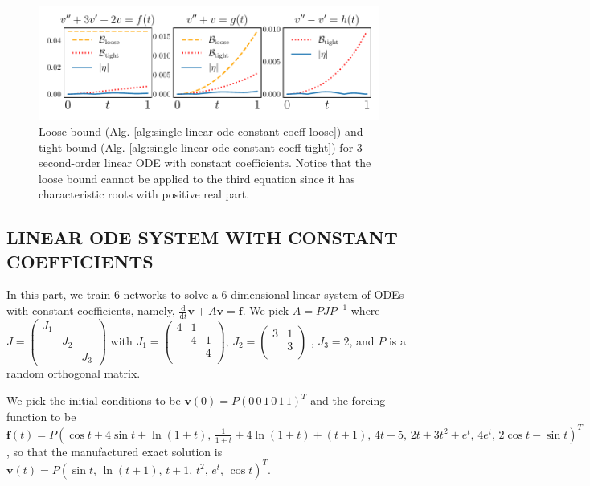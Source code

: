 \documentclass[accepted]{uai2023}
\newcommand{\vect}[1]{\mathbf{#1}}
\begin{document}
    \begin{figure}[!htp]
        \centering
        \vspace{-1em}
        \includegraphics[width=\linewidth]{assets/2nd-order.pdf}
        \caption{\small
            Loose bound (Alg. \ref{alg:single-linear-ode-constant-coeff-loose}) and tight bound (Alg. \ref{alg:single-linear-ode-constant-coeff-tight}) for 3 second-order linear ODE with constant coefficients.
            Notice that the loose bound cannot be applied to the third equation since it has characteristic roots with positive real part.
        }\label{fig:2nd-order-bound} 
    \end{figure}

\subsection{LINEAR ODE SYSTEM WITH CONSTANT COEFFICIENTS} \label{section:high-dimension}
    \begingroup 
        \setlength\arraycolsep{1pt}
        In this part, we train $6$ networks to solve a $6$-dimensional linear system of ODEs with constant coefficients, namely, $\frac{\mathrm{d}}{\mathrm{d}t}\vect{v} + A\vect{v} = \vect{f}$. 
        We pick $A = PJP^{-1}$ where {\small $J=\begin{pmatrix}J_1\\[-0.75ex]&J_2\\[-0.75ex]&&J_3\end{pmatrix}$} with {\small $J_1 = \begin{pmatrix} 4&1\\[-0.75ex]&4&1\\[-0.75ex]&&4\\[-0.5ex]\end{pmatrix}$, $J_2 = \begin{pmatrix} 3&1\\[-0.75ex]&3\\[-0.5ex]\end{pmatrix}$ }, $J_3=2$, and $P$ is a random orthogonal matrix.
    \endgroup

    We pick the initial conditions to be $\vect{v}(0) = P(0\, 0\, 1\, 0\, 1\, 1)^{T}$ and the forcing function to be $\vect{f}(t) = P(\cos t + 4 \sin t  + \ln(1+t),\, \frac{1}{1+t} + 4 \ln(1+t) + (t+1),\, 4t + 5,\, 2t + 3t^2 + e^t,\, 4 e^t,\, 2 \cos t - \sin t )^T$, so that the manufactured exact solution is $\vect{v}(t) = P ( \sin t,\, \ln(t + 1),\, t + 1,\, t^2,\, e^t,\, \cos t)^T$.
\end{document}
